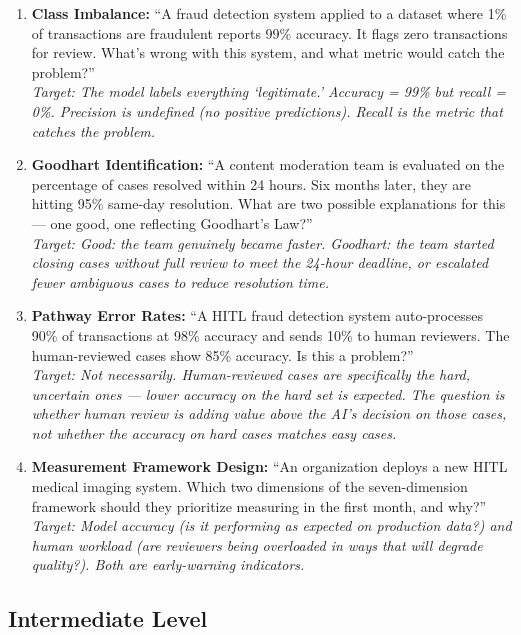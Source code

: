 \begin{enumerate}
    \item \textbf{Class Imbalance:} ``A fraud detection system applied to a dataset where 1\% of transactions are fraudulent reports 99\% accuracy. It flags zero transactions for review. What's wrong with this system, and what metric would catch the problem?''\\
    \textit{Target: The model labels everything `legitimate.' Accuracy = 99\% but recall = 0\%. Precision is undefined (no positive predictions). Recall is the metric that catches the problem.}

    \item \textbf{Goodhart Identification:} ``A content moderation team is evaluated on the percentage of cases resolved within 24 hours. Six months later, they are hitting 95\% same-day resolution. What are two possible explanations for this --- one good, one reflecting Goodhart's Law?''\\
    \textit{Target: Good: the team genuinely became faster. Goodhart: the team started closing cases without full review to meet the 24-hour deadline, or escalated fewer ambiguous cases to reduce resolution time.}

    \item \textbf{Pathway Error Rates:} ``A HITL fraud detection system auto-processes 90\% of transactions at 98\% accuracy and sends 10\% to human reviewers. The human-reviewed cases show 85\% accuracy. Is this a problem?''\\
    \textit{Target: Not necessarily. Human-reviewed cases are specifically the hard, uncertain ones --- lower accuracy on the hard set is expected. The question is whether human review is adding value above the AI's decision on those cases, not whether the accuracy on hard cases matches easy cases.}

    \item \textbf{Measurement Framework Design:} ``An organization deploys a new HITL medical imaging system. Which two dimensions of the seven-dimension framework should they prioritize measuring in the first month, and why?''\\
    \textit{Target: Model accuracy (is it performing as expected on production data?) and human workload (are reviewers being overloaded in ways that will degrade quality?). Both are early-warning indicators.}
\end{enumerate}

\subsection{Intermediate Level}

